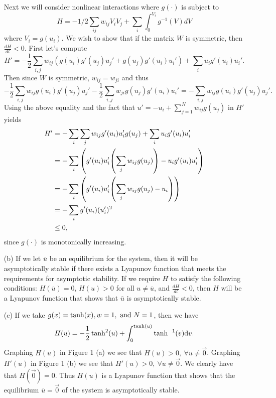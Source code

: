 \documentclass[12pt]{report}
\begin{document}
\begin{solution}
\begin{itemize}
        Next we will consider nonlinear interactions where $g(\cdot)$ is subject to
        \[ 
            H=-1/2 \sum_{ij} w_{ij} V_i V_j + \sum_i \int_0^{V_i} g^{-1}(V) dV    
        \]
        where $V_i = g(u_i)$. We wish to show that if the matrix $W$ is symmetric, then $\frac{dH}{dt} < 0$. First let's compute 
        \[ 
            H' = - \frac{1}{2}\sum_{i,j}w_{ij}(g(u_i)g'(u_j)u_j' + g(u_j)g'(u_i)u_i') + \sum_{i}u_i g'(u_i)u_i'.
        \]
        Then since $W$ is symmetric, $w_{ij} = w_{ji}$ and thus 
        \[ 
            - \frac{1}{2} \sum_{i,j} w_{ij}g(u_i)g'(u_j)u_j' - \frac{1}{2} \sum_{i,j} w_{ji}g(u_j)g'(u_i)u_i' = - \sum_{i,j} w_{ij}g(u_i)g'(u_j)u_j'.
        \]
        Using the above equality and the fact that $u' = -u_i + \sum_{j=1}^N w_{ij} g(u_j)$ in $H'$ yields
        \begin{align*}
            H' &= - \sum_{i} \sum_{j} w_{ij} g'(u_i)u_i'g(u_j) + \sum_i u_i g'(u_i)u_i'\\
            &= - \sum_i{\left(g'(u_i)u_i'{\left(\sum_j w_{ij}g(u_j)\right)} - u_i g'(u_i)u'_i\right)}\\
            &= - \sum_i{\left(g'(u_i)u_i'{\left(\sum_j w_{ij}g(u_j)- u_i\right)} \right)}\\
            &= -\sum_i g'(u_i)(u_i')^2\\
            &\leq 0,
        \end{align*}
        since $g(\cdot)$ is monotonically increasing. 

        \item[(b)]
        If we let $\overline{u}$ be an equilibrium for the system, then it will be asymptotically stable if there exists a Lyapunov function that meets the requirements for asymptotic stability. If we require $H$ to satisfy the following conditions: $H(\overline{u}) = 0$, $H(u) > 0$ for all $u \neq \overline{u}$, and $\frac{dH}{dt} < 0$, then $H$ will be a Lyapunov function that shows that $\overline{u}$ is asymptotically stable.  

        \item[(c)]
        If we take $g(x) = \tanh(x), w=1, {~\text{and}~} N=1$, then we have
        \[ 
            H(u) = - \frac{1}{2} \tanh^2(u) + \int_0^{\tanh(u)} \tanh^{-1}(v)\mathrm{d}v.
        \]
        Graphing $H(u)$ in Figure 1 (a) we see that $H(u) > 0, ~\forall u \neq \vec{0}$.  Graphing $H'(u)$ in Figure 1 (b) we see that $H'(u) > 0, ~\forall u \neq \vec{0}$. We clearly have that $H(\vec{0}) = 0$. Thus $H(u)$ is a Lyapunov function that shows that the equilibrium $\overline{u} = \vec{0}$ of the system is asymptotically stable. 


\end{itemize}
\end{solution}
\end{document}
